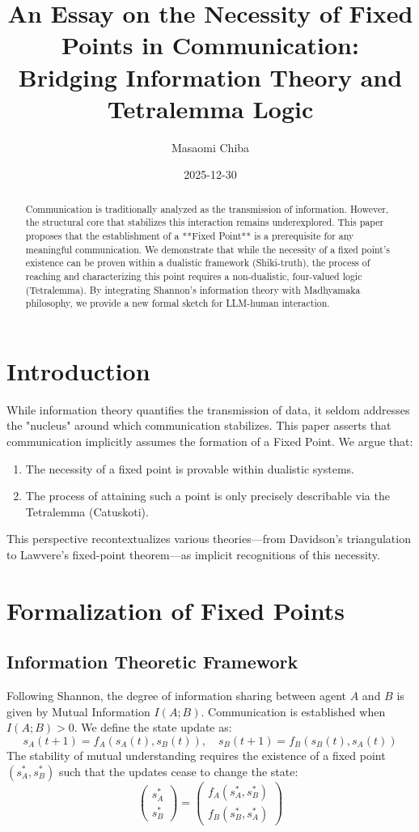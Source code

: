 \documentclass[11pt,a4paper]{article}
\title{An Essay on the Necessity of Fixed Points in Communication:\\ 
Bridging Information Theory and Tetralemma Logic}
\author{Masaomi Chiba}
\date{2025-12-30}
\begin{document}
\maketitle

\begin{abstract}
Communication is traditionally analyzed as the transmission of information. However, the structural core that stabilizes this interaction remains underexplored. This paper proposes that the establishment of a **Fixed Point** is a prerequisite for any meaningful communication. We demonstrate that while the necessity of a fixed point's existence can be proven within a dualistic framework (Shiki-truth), the process of reaching and characterizing this point requires a non-dualistic, four-valued logic (Tetralemma). By integrating Shannon's information theory with Madhyamaka philosophy, we provide a new formal sketch for LLM-human interaction.
\end{abstract}

\section{Introduction}
While information theory quantifies the transmission of data, it seldom addresses the "nucleus" around which communication stabilizes. This paper asserts that communication implicitly assumes the formation of a Fixed Point. We argue that:
\begin{enumerate}
    \item The necessity of a fixed point is provable within dualistic systems.
    \item The process of attaining such a point is only precisely describable via the Tetralemma (Catuskoti).
\end{enumerate}
This perspective recontextualizes various theories—from Davidson's triangulation to Lawvere's fixed-point theorem—as implicit recognitions of this necessity.

\section{Formalization of Fixed Points}

\subsection{Information Theoretic Framework}
Following Shannon, the degree of information sharing between agent $A$ and $B$ is given by Mutual Information $I(A;B)$. Communication is established when $I(A;B) > 0$. We define the state update as:
\[ s_A(t+1) = f_A(s_A(t), s_B(t)), \quad s_B(t+1) = f_B(s_B(t), s_A(t)) \]
The stability of mutual understanding requires the existence of a fixed point $(s_A^*, s_B^*)$ such that the updates cease to change the state:
\[ \begin{pmatrix} s_A^* \\ s_B^* \end{pmatrix} = \begin{pmatrix} f_A(s_A^*, s_B^*) \\ f_B(s_B^*, s_A^*) \end{pmatrix} \]
\end{document}
